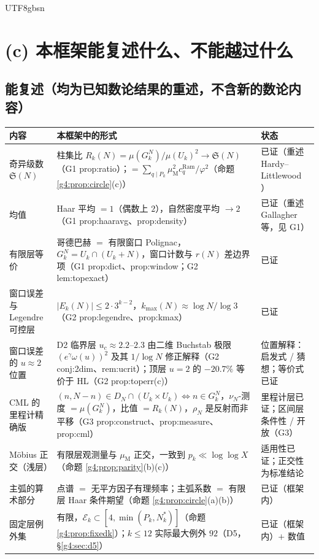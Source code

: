 \documentclass[11pt,a4paper]{article}
\newcommand{\Haar}{\mu}
\newcommand{\Sing}{\mathfrak S}
\newcommand{\kmax}{k_{\max}}           %
\newcommand{\Mob}{\mu_{\mathrm{M}}}    %
\newcommand{\Ram}{c^{\mathrm{Ram}}}    %
\newcommand{\Exc}{\mathcal E}          %
\theoremstyle{plain}
\theoremstyle{definition}
\begin{document}
\begin{CJK}{UTF8}{gbsn}
\section{(c) 本框架能复述什么、不能越过什么}\label{g4:sec:list}

\subsection{能复述（均为已知数论结果的重述，不含新的数论内容）}
\begin{center}
\begin{tabular}{p{4.4cm}p{6.0cm}p{4.0cm}}
\hline
内容 & 本框架中的形式 & 状态\\
\hline
奇异级数 $\Sing(N)$ & 柱集比 $R_k(N)=\Haar(G_k^N)/\Haar(U_k)^2\to\Sing(N)$（G1 prop:ratio）；$=\sum_{q\mid P_k}\Mob^2\Ram_q/\varphi^2$（命题 \ref{g4:prop:circle}(c)） & 已证（重述 Hardy--Littlewood \cite{HL23}）\\
均值 & Haar 平均 $=1$（偶数上 $2$），自然密度平均 $\to2$（G1 prop:haaravg、prop:density） & 已证（重述 Gallagher 等，见 G1）\\
有限层等价 & 哥德巴赫 $=$ 有限窗口 Polignac，$G_k^N=U_k\cap(U_k+N)$，窗口计数与 $r(N)$ 差边界项（G1 prop:dict、prop:window；G2 lem:topexact） & 已证\\
窗口误差与 Legendre 可控层 & $|E_k(N)|\le2\cdot3^{k-2}$，$\kmax(N)\approx\log N/\log3$（G2 prop:legendre、prop:kmax） & 已证\\
窗口误差的 $u\approx2$ 位置 & D2 临界层 $u_c\approx2.2$--$2.3$ 由二维 Buchstab 极限 $(e^\gamma\omega(u))^2$ 及其 $1/\log N$ 修正解释（G2 conj:2dim、rem:ucrit）；顶层 $u=2$ 的 $-20.7\%$ 等价于 HL（G2 prop:toperr(c)） & 位置解释：启发式 / 猜想；等价式已证\\
CML 的里程计精确版 & $(n,N-n)\in D_N\cap(U_k\times U_k)\iff n\in G_k^N$，$\nu_N$-测度 $=\Haar(G_k^N)$，比值 $=R_k(N)$，$\rho_N$ 是反射而非平移（G3 prop:construct、prop:measure、prop:cml） & 里程计层已证；区间层条件性 / 开放（G3）\\
M\"obius 正交（浅层） & 有限层观测量与 $\Mob$ 正交，一致到 $p_k\ll\log\log X$（命题 \ref{g4:prop:parity}(b)(c)） & 适用性已证；正交性为标准结论\\
主弧的算术部分 & 点谱 $=$ 无平方因子有理频率；主弧系数 $=$ 有限层 Haar 条件期望（命题 \ref{g4:prop:circle}(a)(b)） & 已证（框架内）\\
固定层例外集 & 有限，$\Exc_k\subset[4,\min(P_k,N_k^*)]$（命题 \ref{g4:prop:fixedk}）；$k\le12$ 实际最大例外 $92$（D5，\S\ref{g4:sec:d5}） & 已证（框架内）$+$ 数值\\
\hline
\end{tabular}
\end{center}


\end{CJK}
\end{document}
